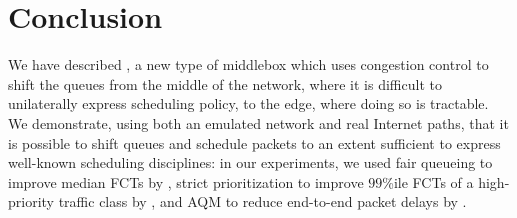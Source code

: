 \section{Conclusion}\label{s:concl}
We have described \name, a new type of middlebox which uses congestion control to shift the queues from the middle of the network, where it is difficult to unilaterally express scheduling policy, to the edge, where doing so is tractable.
We demonstrate, using both an emulated network and real Internet paths, that it is possible to shift queues and schedule packets to an extent sufficient to express well-known scheduling disciplines: in our experiments, we used fair queueing to improve median FCTs by \overviewBenefitsBundlerMedianImprovement, strict prioritization to improve $99$\%ile FCTs of a high-priority traffic class by \strictPrioImprovement, and AQM to reduce end-to-end packet delays by \delaysImprovement.

